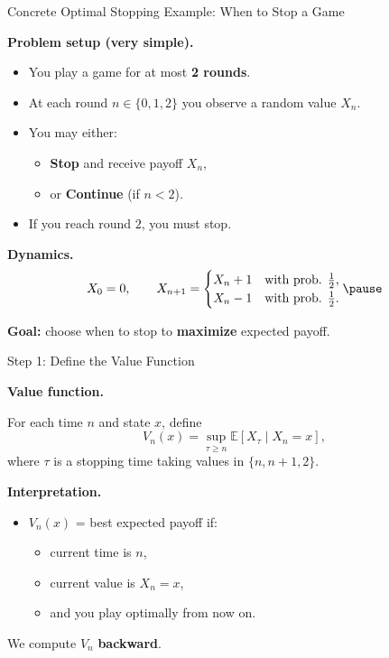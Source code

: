\documentclass[aspectratio=169]{beamer}
\begin{document}
\begin{frame}{Concrete Optimal Stopping Example: When to Stop a Game}

\textbf{Problem setup (very simple).}

\begin{itemize}
  \item You play a game for at most \textbf{2 rounds}.\pause
  \item At each round $n\in\{0,1,2\}$ you observe a random value $X_n$.\pause
  \item You may either:
  \begin{itemize}
    \item \textbf{Stop} and receive payoff $X_n$,\pause
    \item or \textbf{Continue} (if $n<2$).\pause
  \end{itemize}
  \item If you reach round $2$, you must stop.
\end{itemize}

\medskip

\textbf{Dynamics.}
\[
X_0=0,\qquad
X_{n+1} =
\begin{cases}
X_n + 1 & \text{with prob. } \tfrac12,\\
X_n - 1 & \text{with prob. } \tfrac12.
\end{cases}\pause
\]

\medskip
\textbf{Goal:} choose when to stop to \textbf{maximize} expected payoff.
\end{frame}

\begin{frame}{Step 1: Define the Value Function}

\textbf{Value function.}

For each time $n$ and state $x$, define
\[
V_n(x)
=
\sup_{\tau \ge n}
\mathbb{E}\!\left[X_\tau \mid X_n=x\right],
\]
where $\tau$ is a stopping time taking values in $\{n,n+1,2\}$.\pause

\medskip

\textbf{Interpretation.}
\begin{itemize}
  \item $V_n(x)$ = best expected payoff if:
  \begin{itemize}
    \item current time is $n$,
    \item current value is $X_n=x$,
    \item and you play optimally from now on.
  \end{itemize}\pause
\end{itemize}

\medskip
We compute $V_n$ \textbf{backward}.
\end{frame}
\end{document}
